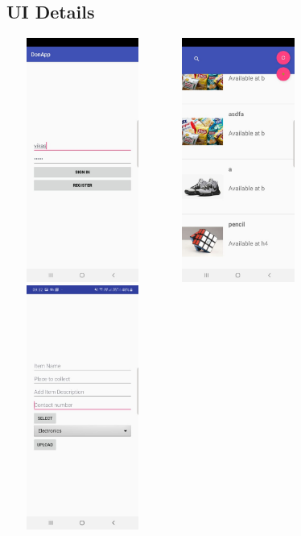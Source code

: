 \documentclass[12pt, a4paper]{article}
\begin{document}
\subsection{UI Details}
\includegraphics[width=5cm, height=8cm]{login.jpeg}
\includegraphics[width=5cm, height=8cm]{list.jpeg}
\includegraphics[width=5cm, height=8cm]{additem.jpeg}
\end{document}
